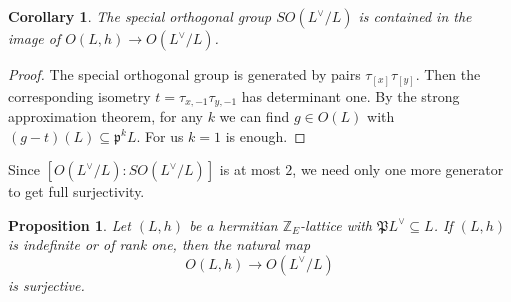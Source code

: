 \documentclass{amsart}
\theoremstyle{definition}
\theoremstyle{plain}
\newtheorem{proposition}[definition]{Proposition}
\newtheorem{corollary}[definition]{Corollary}
\newcommand{\ZZ}{\mathbb{Z}}
\newcommand{\disc}[1]{#1^{\vee} \! / #1 }
\begin{document}
\begin{corollary}
The special orthogonal group $SO(\disc{L})$ is contained in the image of $O(L,h) \rightarrow O(\disc{L})$.
\end{corollary}
\begin{proof}
 The special orthogonal group is generated by pairs
 $\tau_{[x]}\tau_{[y]}$. Then the corresponding isometry
 $t=\tau_{x,-1}\tau_{y,-1}$ has determinant one. By the strong approximation theorem, for any $k$ we can find $g \in O(L)$ with $(g-t)(L) \subseteq \mathfrak{p}^kL$. For us $k=1$ is enough.
\end{proof}

Since $[O(\disc{L}):SO(\disc{L})]$ is at most $2$, we need only one more generator to get full surjectivity.

\begin{proposition} \label{prop: surjectivity}
 Let $(L,h)$ be a hermitian $\ZZ_E$-lattice with $\mathfrak{P} L^\vee \subseteq L$.
 If $(L,h)$ is indefinite or of rank one, then the natural map
 \[O(L,h) \rightarrow O(\disc{L})\]
 is surjective.
\end{proposition}
\end{document}
